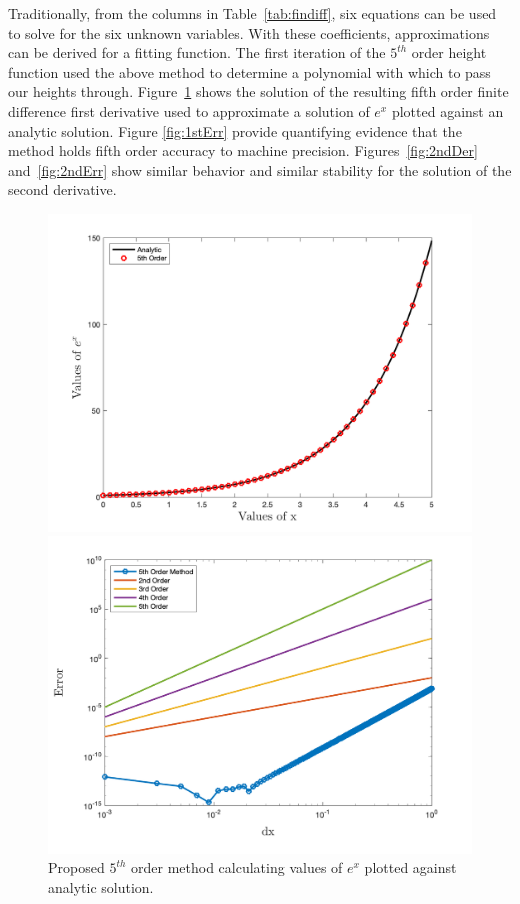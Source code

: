 Traditionally, from the columns in Table~\ref{tab:findiff}, six equations can be used to solve for the six unknown variables. With these coefficients, approximations can be derived for a fitting function. The first iteration of the $5^{th}$ order height function used the above method to determine a polynomial with which to pass our heights through. Figure~\ref{fig:1stDer} shows the solution of the resulting fifth order finite difference first derivative used to approximate a solution of $e^x$ plotted against an analytic solution. Figure \ref{fig:1stErr} provide quantifying evidence that the method holds fifth order accuracy to machine precision.  Figures~\ref{fig:2ndDer} and~\ref{fig:2ndErr} show similar behavior and similar stability for the solution of the second derivative.
\begin{figure}[htbp]
	\centering
	\begin{minipage}{.45\textwidth}
		\centering
		\includegraphics[width=1.0\linewidth]{figs/1stDer.png}
		\caption{Proposed $5^{th}$ order method calculating values of $e^x$ plotted against analytic solution.}
		\label{fig:1stDer}
	\end{minipage}%
\hfill
	\begin{minipage}{0.45\textwidth}
		\centering
		\includegraphics[width=1.0\linewidth]{figs/1stErr.png}

\end{minipage}
\end{figure}
